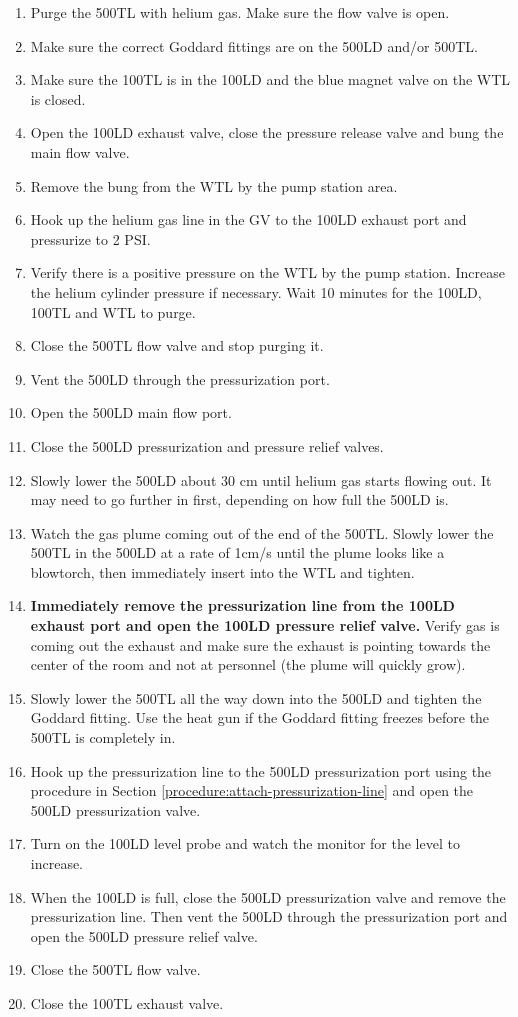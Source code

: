 \begin{enumerate}
 \item Purge the 500TL with helium gas.  Make sure the flow valve is open.
 \item Make sure the correct Goddard fittings are on the 500LD and/or 500TL.
 \item Make sure the 100TL is in the 100LD and the blue magnet valve on the WTL is closed.
 \item Open the 100LD exhaust valve, close the pressure release valve and bung the main flow valve.
 \item Remove the bung from the WTL by the pump station area.
 \item Hook up the helium gas line in the GV to the 100LD exhaust port and pressurize to 2 PSI.
 \item Verify there is a positive pressure on the WTL by the pump station.  Increase the helium cylinder pressure if necessary.  Wait 10 minutes for the 100LD, 100TL and WTL to purge.
 \item Close the 500TL flow valve and stop purging it.
 \item Vent the 500LD through the pressurization port.
 \item Open the 500LD main flow port.
 \item Close the 500LD pressurization and pressure relief valves.
 \item Slowly lower the 500LD about 30 cm until helium gas starts flowing out.  It may need to go further in first, depending on how full the 500LD is.
 \item Watch the gas plume coming out of the end of the 500TL.  Slowly lower the 500TL in the 500LD at a rate of 1cm/s until the plume looks like a blowtorch, then immediately insert into the WTL and tighten.
 \item \textbf{Immediately remove the pressurization line from the 100LD exhaust port and open the 100LD pressure relief valve.} Verify gas is coming out the exhaust and make sure the exhaust is pointing towards the center of the room and not at personnel (the plume will quickly grow).
 \item Slowly lower the 500TL all the way down into the 500LD and tighten the Goddard fitting.  Use the heat gun if the Goddard fitting freezes before the 500TL is completely in.
 \item Hook up the pressurization line to the 500LD pressurization port using the procedure in Section \ref{procedure:attach-pressurization-line} and open the 500LD pressurization valve.
 \item Turn on the 100LD level probe and watch the monitor for the level to increase.
 \item When the 100LD is full, close the 500LD pressurization valve and remove the pressurization line.  Then vent the 500LD through the pressurization port and open the 500LD pressure relief valve.
 \item Close the 500TL flow valve.
 \item Close the 100TL exhaust valve.
\end{enumerate}

